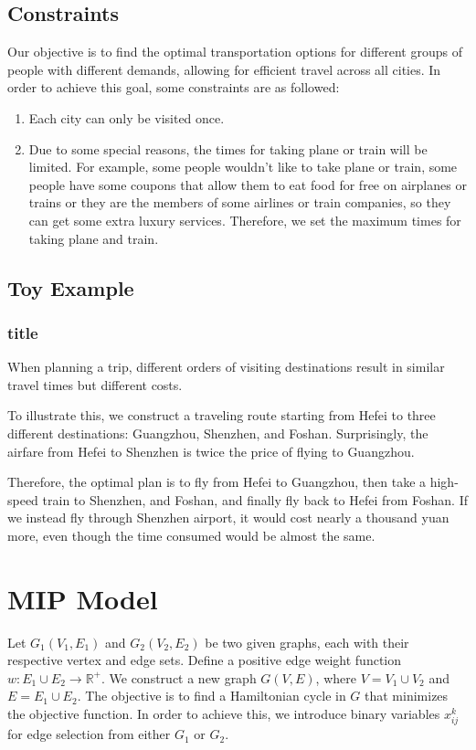 \documentclass{extarticle}
\begin{document}
\subsection{Constraints}

Our objective is to find the optimal transportation options for different
groups of people with different demands, allowing for efficient travel across
all cities. In order to achieve this goal, some constraints are as followed:

\begin{enumerate}
  \item Each city can only be visited once.
  \item Due to some special reasons, the times for taking plane or train will be
        limited. For example, some people wouldn't like to take plane or train, some
        people have some coupons that allow them to eat food for free on airplanes or
        trains or they are the members of some airlines or train companies, so they can
        get some extra luxury services. Therefore, we set the maximum times for taking
        plane and train.
\end{enumerate}

\subsection{Toy Example}

\subsubsection{title}
When planning a trip, different orders of visiting destinations result in
similar travel times but different costs.

To illustrate this, we construct a traveling route starting from Hefei to three
different destinations: Guangzhou, Shenzhen, and Foshan. Surprisingly, the
airfare from Hefei to Shenzhen is twice the price of flying to Guangzhou.

Therefore, the optimal plan is to fly from Hefei to Guangzhou, then take a
high-speed train to Shenzhen, and Foshan, and finally fly back to Hefei from
Foshan. If we instead fly through Shenzhen airport, it would cost nearly a
thousand yuan more, even though the time consumed would be almost the same.

\section{MIP Model}
Let $G_1(V_1, E_1)$ and $G_2(V_2, E_2)$ be two given graphs, each with their
respective vertex and edge sets. Define a positive edge weight function $w :
  E_1 \cup E_2 \rightarrow \mathbb{R}^+$. We construct a new graph $G(V, E)$,
where $V = V_1 \cup V_2$ and $E = E_1 \cup E_2$. The objective is to find a
Hamiltonian cycle in $G$ that minimizes the objective function. In order to
achieve this, we introduce binary variables $x_{ij}^k$ for edge selection from
either $G_1$ or $G_2$.
\end{document}
